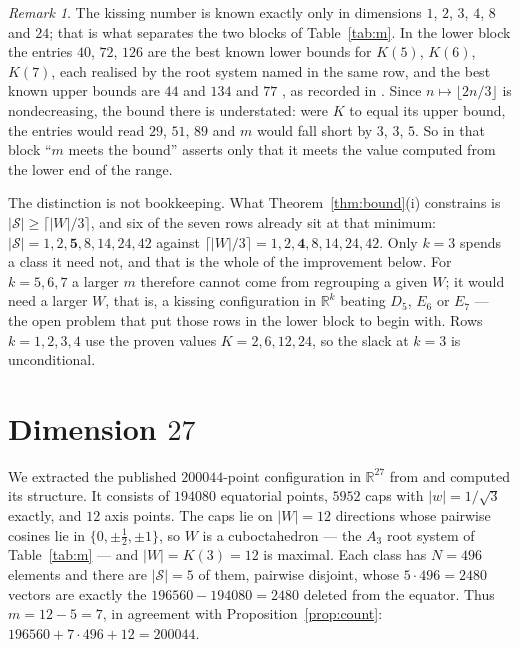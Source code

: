 \documentclass[11pt]{amsart}
\theoremstyle{remark}
\newtheorem{remark}[theorem]{Remark}
\begin{document}
\begin{remark}\label{rem:table}
The kissing number is known exactly only in dimensions $1$, $2$, $3$, $4$, $8$
and $24$; that is what separates the two blocks of Table~\ref{tab:m}. In the
lower block the entries $40$, $72$, $126$ are the best known lower bounds for
$K(5)$, $K(6)$, $K(7)$, each realised by the root system named in the same row,
and the best known upper bounds are $44$ and $134$ \cite{mv2010} and $77$
\cite{dllk2024}, as recorded in \cite{cohn-table}. Since $n\mapsto\lfloor2n/3\rfloor$ is
nondecreasing, the bound there is understated: were $K$ to equal its upper
bound, the entries would read $29$, $51$, $89$ and $m$ would fall short by $3$,
$3$, $5$. So in that block ``$m$ meets the bound'' asserts only that it meets
the value computed from the lower end of the range.

The distinction is not bookkeeping. What Theorem~\ref{thm:bound}(i) constrains
is $|\mathcal S|\ge\lceil|W|/3\rceil$, and six of the seven rows already sit at
that minimum: $|\mathcal S|=1,2,\mathbf{5},8,14,24,42$ against
$\lceil|W|/3\rceil=1,2,\mathbf{4},8,14,24,42$. Only $k=3$ spends a class it need
not, and that is the whole of the improvement below. For $k=5,6,7$ a larger $m$
therefore cannot come from regrouping a given $W$; it would need a larger $W$,
that is, a kissing configuration in $\mathbb{R}^{k}$ beating $D_5$, $E_6$ or
$E_7$ --- the open problem that put those rows in the lower block to begin with.
Rows $k=1,2,3,4$ use the proven values $K=2,6,12,24$, so the slack at $k=3$ is
unconditional.
\end{remark}

\section{Dimension \texorpdfstring{$27$}{27}}\label{sec:dim27}

We extracted the published $200044$-point configuration in $\mathbb{R}^{27}$
from \cite{cohn-data} and computed its structure. It consists of $194080$
equatorial points, $5952$ caps with $|w|=1/\sqrt3$ exactly, and $12$ axis
points. The caps lie on $|W|=12$ directions whose pairwise cosines lie in
$\{0,\pm\tfrac12,\pm1\}$, so $W$ is a cuboctahedron --- the $A_3$ root system of
Table~\ref{tab:m} --- and $|W|=K(3)=12$ is maximal. Each class has $N=496$
elements and there are $|\mathcal S|=5$ of them, pairwise disjoint, whose
$5\cdot496=2480$ vectors are exactly the $196560-194080=2480$ deleted from the
equator. Thus $m=12-5=7$, in agreement with Proposition~\ref{prop:count}:
$196560+7\cdot496+12=200044$.
\end{document}
